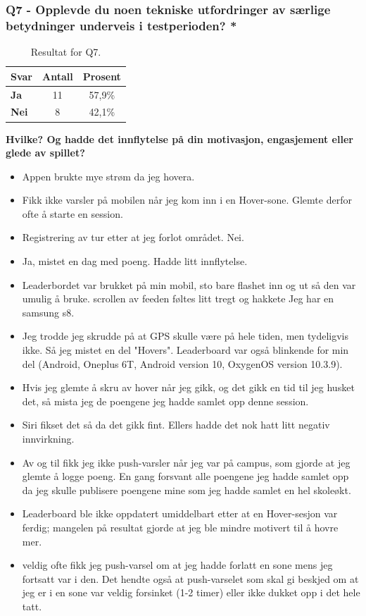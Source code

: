 \subsubsection*{Q7 - Opplevde du noen tekniske utfordringer av særlige betydninger underveis i testperioden? *}
 \begin{table}[H]
    \centering
    \begin{tabularx}{0.4\textwidth}{|>{\bfseries}X|c|c|}
        \hline\textbf{Svar} & \textbf{Antall} & \textbf{Prosent}  \\  \hline
        Ja & 11 & 57,9\%  \\ 
        Nei & 8 & 42,1\% \\
         \hline
    \end{tabularx}
    \caption{Resultat for Q7.}
\end{table}

\textbf{Hvilke? Og hadde det innflytelse på din motivasjon, engasjement eller glede av spillet?}
\begin{itemize}[noitemsep]
	\item Appen brukte mye strøm da jeg hovera.
	\item Fikk ikke varsler på mobilen når jeg kom inn i en Hover-sone. Glemte derfor ofte å starte en session.
	\item Registrering av tur etter at jeg forlot området. Nei.
	\item Ja, mistet en dag med poeng. Hadde litt innflytelse.
	\item Leaderbordet var brukket på min mobil, sto bare flashet inn og ut så den var umulig å bruke. scrollen av feeden føltes litt tregt og hakkete Jeg har en samsung s8.
	\item Jeg trodde jeg skrudde på at GPS skulle være på hele tiden, men tydeligvis ikke. Så jeg mistet en del "Hovers". Leaderboard var også blinkende for min del (Android, Oneplus 6T, Android version 10, OxygenOS version 10.3.9).
	\item Hvis jeg glemte å skru av hover når jeg gikk, og det gikk en tid til jeg husket det, så mista jeg de poengene jeg hadde samlet opp denne session.
	\item Siri fikset det så da det gikk fint. Ellers hadde det nok hatt litt negativ innvirkning.
	\item Av og til fikk jeg ikke push-varsler når jeg var på campus, som gjorde at jeg glemte å logge poeng. En gang forsvant alle poengene jeg hadde samlet opp da jeg skulle publisere poengene mine som jeg hadde samlet en hel skoleøkt.
	\item Leaderboard ble ikke oppdatert umiddelbart etter at en Hover-sesjon var ferdig; mangelen på resultat gjorde at jeg ble mindre motivert til å hovre mer.
	\item veldig ofte fikk jeg push-varsel om at jeg hadde forlatt en sone mens jeg fortsatt var i den. Det hendte også at push-varselet som skal gi beskjed om at jeg er i en sone var veldig forsinket (1-2 timer) eller ikke dukket opp i det hele tatt.
\end{itemize}

